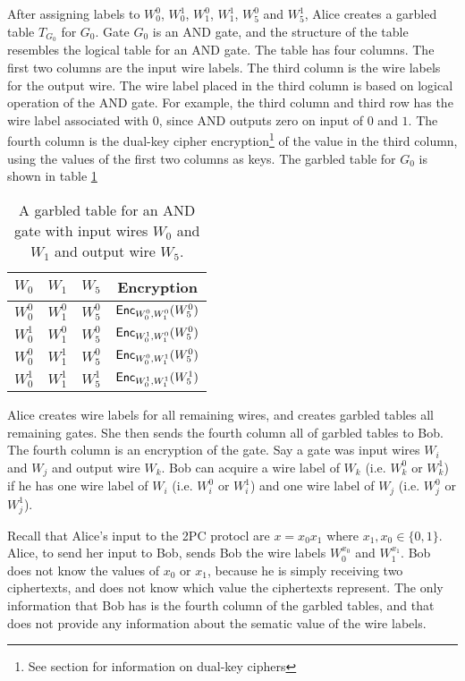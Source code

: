 After assigning labels to $W_0^0$, $W_0^1$, $W_1^0$, $W_1^1$, $W_5^0$ and $W_5^1$, Alice creates a garbled table $T_{G_0}$ for $G_0$.
Gate $G_0$ is an AND gate, and the structure of the table resembles the logical table for an AND gate.
The table has four columns. 
The first two columns are the input wire labels.
The third column is the wire labels for the output wire.
The wire label placed in the third column is based on logical operation of the AND gate.
For example, the third column and third row has the wire label associated with $0$, since AND outputs zero on input of $0$ and $1$.
The fourth column is the dual-key cipher encryption\footnote{See section  for information on dual-key ciphers} of the value in the third column, using the values of the first two columns as keys.
The garbled table for $G_0$ is shown in table \ref{tbl:g0-table}

\begin{table}[h]
\centering
\label{tbl:g0-table}
\begin{tabular}{|c|c|c|c|}
\hline
$W_0$ & $W_1$ & $W_5$ & Encryption \\
\hline
$W_0^0$ & $W_1^0$ & $W_5^0$ & $\textsf{Enc}_{W_0^0, W_1^0}(W_5^0)$ \\
$W_0^1$ & $W_1^0$ & $W_5^0$ & $\textsf{Enc}_{W_0^1, W_1^0}(W_5^0)$ \\
$W_0^0$ & $W_1^1$ & $W_5^0$ & $\textsf{Enc}_{W_0^0, W_1^1}(W_5^0)$ \\
$W_0^1$ & $W_1^1$ & $W_5^1$ & $\textsf{Enc}_{W_0^1, W_1^1}(W_5^1)$ \\
\hline
\end{tabular}
\caption{A garbled table for an AND gate with input wires $W_0$ and $W_1$ and output wire $W_5$.}
\end{table}

Alice creates wire labels for all remaining wires, and creates garbled tables all remaining gates.
She then sends the fourth column all of garbled tables to Bob.
The fourth column is an encryption of the gate.
Say a gate was input wires $W_i$ and $W_j$ and output wire $W_k$.
Bob can acquire a wire label of $W_k$ (i.e. $W_k^0$ or $W_k^1$) if he has one wire label of $W_i$ (i.e. $W_i^0$ or $W_i^1$) and one wire label of $W_j$ (i.e. $W_j^0$ or $W_j^1$).

Recall that Alice's input to the 2PC protocl are $x = x_0x_1$ where $x_1, x_0 \in \{0,1\}$.
Alice, to send her input to Bob, sends Bob the wire labels $W_0^{x_0}$ and $W_1^{x_1}$.
Bob does not know the values of $x_0$ or $x_1$, because he is simply receiving two ciphertexts, and does not know which value the ciphertexts represent.
The only information that Bob has is the fourth column of the garbled tables, and that does not provide any information about the sematic value of the wire labels.

